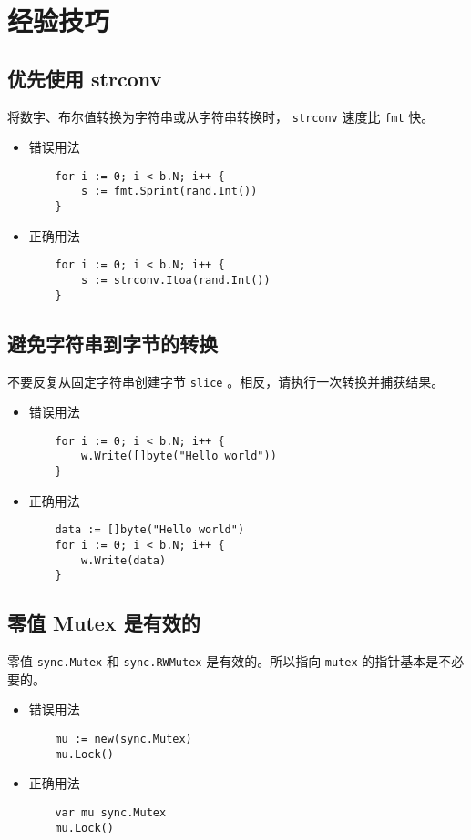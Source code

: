 \chapter{经验技巧}
\section{优先使用 strconv}
将数字、布尔值转换为字符串或从字符串转换时， \texttt{strconv} 速度比 \texttt{fmt} 快。
\begin{itemize}[leftmargin=4em]
\item 错误用法

  \begin{verbatim}
    for i := 0; i < b.N; i++ {
    	s := fmt.Sprint(rand.Int())
    }
  \end{verbatim}
\item 正确用法

  \begin{verbatim}
    for i := 0; i < b.N; i++ {
    	s := strconv.Itoa(rand.Int())
    }
  \end{verbatim}
\end{itemize}

\section{避免字符串到字节的转换}
不要反复从固定字符串创建字节 \texttt{slice} 。相反，请执行一次转换并捕获结果。
\begin{itemize}[leftmargin=4em]
\item 错误用法

  \begin{verbatim}
    for i := 0; i < b.N; i++ {
    	w.Write([]byte("Hello world"))
    }
  \end{verbatim}
\item 正确用法

  \begin{verbatim}
    data := []byte("Hello world")
    for i := 0; i < b.N; i++ {
    	w.Write(data)
    }
  \end{verbatim}
\end{itemize}

\section{零值 Mutex 是有效的}
零值 \texttt{sync.Mutex} 和 \texttt{sync.RWMutex} 是有效的。所以指向 \texttt{mutex} 的指针基本是不必要的。
\begin{itemize}[leftmargin=4em]
\item 错误用法

  \begin{verbatim}
    mu := new(sync.Mutex)
    mu.Lock()
  \end{verbatim}
\item 正确用法

  \begin{verbatim}
    var mu sync.Mutex
    mu.Lock()
  \end{verbatim}
\end{itemize}

